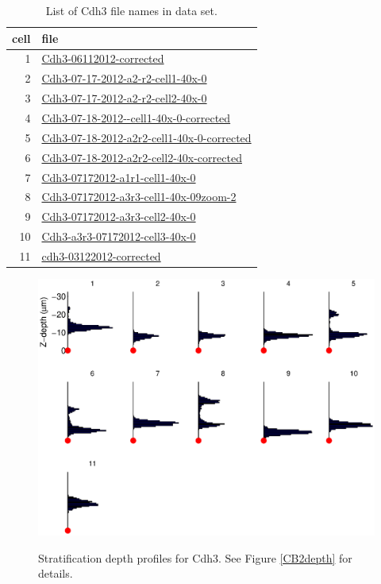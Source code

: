 \documentclass{article}
\begin{document}
\begin{table}
  \centering
  \begin{tabular}{rl}
    \toprule
    cell & file \\
    \midrule
    1& \url{Cdh3-06112012-corrected} \\
    2& \url{Cdh3-07-17-2012-a2-r2-cell1-40x-0} \\
    3& \url{Cdh3-07-17-2012-a2-r2-cell2-40x-0} \\
    4& \url{Cdh3-07-18-2012--cell1-40x-0-corrected} \\
    5& \url{Cdh3-07-18-2012-a2r2-cell1-40x-0-corrected} \\
    6& \url{Cdh3-07-18-2012-a2r2-cell2-40x-corrected} \\
    7& \url{Cdh3-07172012-a1r1-cell1-40x-0} \\
    8& \url{Cdh3-07172012-a3r3-cell1-40x-09zoom-2} \\
    9& \url{Cdh3-07172012-a3r3-cell2-40x-0} \\
    10& \url{Cdh3-a3r3-07172012-cell3-40x-0} \\
    11& \url{cdh3-03122012-corrected} \\
    \bottomrule
  \end{tabular}
  \caption{List of Cdh3 file names in data set. \label{Cdh3filenames}}
\end{table}



\clearpage


\begin{figure}
  \centering
  {\includegraphics[scale=1]{Figures/SupFig2/Cdh3-stratification-depth-1}}
  \caption{Stratification depth profiles for Cdh3. See Figure
    \ref{CB2depth} for details.}
\end{figure}
\end{document}
